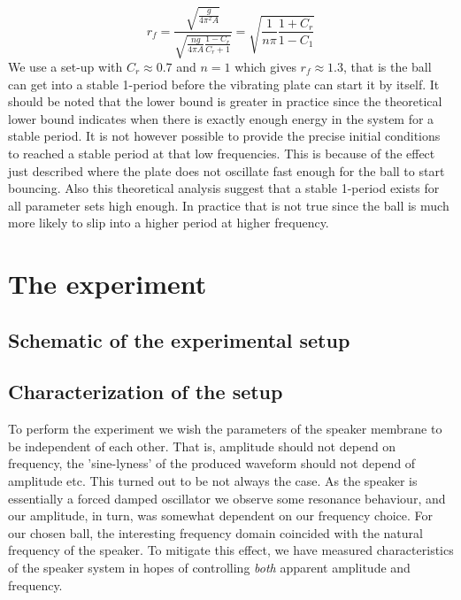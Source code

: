 \documentclass[12pt,oneside,a4paper]{article}
\numberwithin{equation}{section}
\begin{document}
{{{{\begin{equation}
	r_f=\frac{\sqrt{\frac{g}{4\pi^2A}}}{\sqrt{\frac{ng}{4\pi A}\frac{1-C_r}{C_r+1}}} = \sqrt{\frac{1}{n\pi} \frac{1+C_r}{1-C_1}}
\end{equation}
We use a set-up with $C_r\approx 0.7$ and $n=1$ which gives $r_f\approx1.3$, that is the ball can get into a stable 1-period before the vibrating plate can start it by itself. It should be noted that the lower bound is greater in practice since the theoretical lower bound indicates when there is exactly enough energy in the system for a stable period. It is not however possible to provide the precise initial conditions to reached a stable period at that low frequencies. This is because of the effect just described where the plate does not oscillate fast enough for the ball to start bouncing. Also this theoretical analysis suggest that a stable 1-period exists for all parameter sets high enough. In practice that is not true since the ball is much more likely to slip into a higher period at higher frequency. 

\section{The experiment}
\subsection{Schematic of the experimental setup}
\subsection{Characterization of the setup}
To perform the experiment we wish the parameters of the speaker membrane to be independent of each other. That is, amplitude should not depend on frequency, the 'sine-lyness' of the produced waveform should not depend of amplitude etc. This turned out to be not always the case. As the speaker is essentially a forced damped oscillator we observe some resonance behaviour, and our amplitude, in turn, was somewhat dependent on our frequency choice. For our chosen ball, the interesting frequency domain coincided with the natural frequency of the speaker. To mitigate this effect, we have measured characteristics of the speaker system in hopes of controlling \emph{both} apparent amplitude and frequency.  

}}}}
\end{document}
